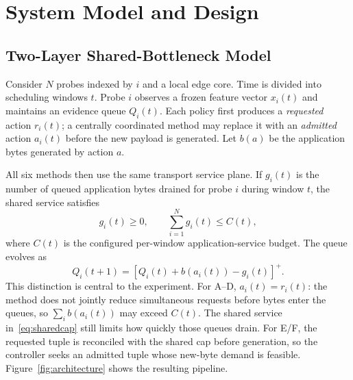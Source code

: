 \documentclass[10pt,journal]{IEEEtran}
\begin{document}
\section{System Model and Design}
\subsection{Two-Layer Shared-Bottleneck Model}
Consider $N$ probes indexed by $i$ and a local edge core. Time is divided into scheduling windows $t$. Probe $i$ observes a frozen feature vector $x_i(t)$ and maintains an evidence queue $Q_i(t)$. Each policy first produces a \emph{requested} action $r_i(t)$; a centrally coordinated method may replace it with an \emph{admitted} action $a_i(t)$ before the new payload is generated. Let $b(a)$ be the application bytes generated by action $a$.

All six methods then use the same transport service plane. If $g_i(t)$ is the number of queued application bytes drained for probe $i$ during window $t$, the shared service satisfies
\begin{equation}
    g_i(t)\ge 0,\qquad \sum_{i=1}^{N} g_i(t)\le C(t),
    \label{eq:sharedcap}
\end{equation}
where $C(t)$ is the configured per-window application-service budget. The queue evolves as
\begin{equation}
    Q_i(t+1)=\left[Q_i(t)+b(a_i(t))-g_i(t)\right]^+.
    \label{eq:queue}
\end{equation}
This distinction is central to the experiment. For A--D, $a_i(t)=r_i(t)$: the method does not jointly reduce simultaneous requests before bytes enter the queues, so $\sum_i b(a_i(t))$ may exceed $C(t)$. The shared service in~\eqref{eq:sharedcap} still limits how quickly those queues drain. For E/F, the requested tuple is reconciled with the shared cap before generation, so the controller seeks an admitted tuple whose new-byte demand is feasible. Figure~\ref{fig:architecture} shows the resulting pipeline.
\end{document}
